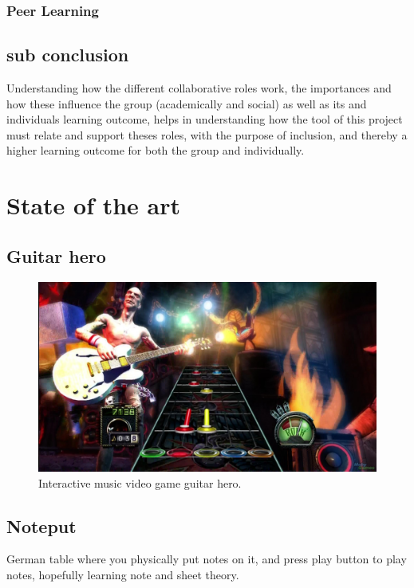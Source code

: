 \subsubsection{Peer Learning}



\subsection{sub conclusion}
Understanding how the different collaborative roles work, the importances and how these influence the group (academically and social) as well as its and individuals learning outcome, helps in understanding how the tool of this project must relate and support theses roles, with the purpose of inclusion, and thereby a higher learning outcome for both the group and individually. 

\section{State of the art}\label{sec:sota}
	
	\subsection{Guitar hero}\label{sec:guitarHero}
		\begin{figure}[H]
			\centering
			\includegraphics[width=0.7\linewidth]{figure/Analysis/guitarhero}
			\caption{Interactive music video game guitar hero.}
			\label{fig:guitarHero}
		\end{figure}
	\subsection{Noteput}
		German table where you physically put notes on it, and press play button to play notes, hopefully learning note and sheet theory.
